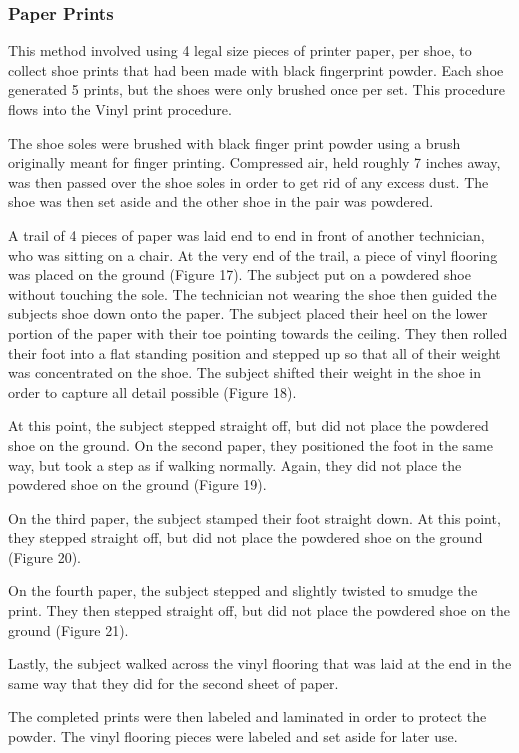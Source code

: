 \newpage

\subsubsection{Paper Prints}
 This method involved using 4 legal size pieces of printer paper, per shoe, to collect shoe prints that had been made with black fingerprint powder. Each shoe  generated 5 prints, but the shoes were only brushed once per set. This procedure flows into the Vinyl print procedure. 
   
     The shoe soles were brushed with black finger print powder using a brush originally meant for finger printing. Compressed air, held roughly 7 inches away, was then passed over the shoe soles in order to get rid of any excess dust. The shoe was then set aside and the other shoe in the pair was powdered. 
    
   A trail of 4 pieces of paper was laid end to end in front of another technician, who was sitting on a chair. At the very end of the trail, a piece of vinyl flooring was placed on the ground (Figure 17). The subject put on a powdered shoe without touching the sole. The technician not wearing the shoe then guided the subjects shoe down onto the paper. The subject placed their heel on the lower portion of the paper with their toe pointing towards the ceiling. They then rolled their foot into a flat standing position and stepped up so that all of their weight was concentrated on the shoe. The subject shifted their weight in the shoe in order to capture all detail possible (Figure 18). 

  At this point, the subject stepped straight off, but did not place the powdered shoe on the ground. On the second paper, they positioned the foot in the same way, but took a step as if walking normally. Again, they did not place the powdered shoe on the ground (Figure 19). 
  
  On the third paper, the subject stamped their foot straight down. At this point, they stepped straight off, but did not place the powdered shoe on the ground (Figure 20).
  
  On the fourth paper, the subject stepped and slightly twisted to smudge the print. They then stepped straight off, but did not place the powdered shoe on the ground (Figure 21).
  
  Lastly, the subject walked across the vinyl flooring that was laid at the end in the same way that they did for the second sheet of paper. 

   The completed prints were then labeled and laminated in order to protect the powder. The vinyl flooring pieces were labeled and set aside for later use. 
   
